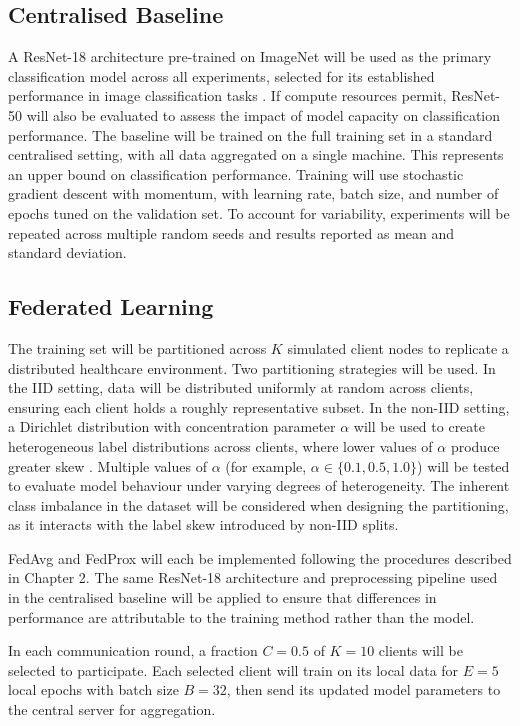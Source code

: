\documentclass[12pt,openany,a4paper]{book}
\begin{document}
\subsection{Centralised Baseline}
A ResNet-18 architecture pre-trained on ImageNet will be used as the primary classification model across all experiments, selected for its established performance in image classification tasks \cite{heDeepResidualLearning2015}. If compute resources permit, ResNet-50 will also be evaluated to assess the impact of model capacity on classification performance. The baseline will be trained on the full training set in a standard centralised setting, with all data aggregated on a single machine. This represents an upper bound on classification performance. Training will use stochastic gradient descent with momentum, with learning rate, batch size, and number of epochs tuned on the validation set. To account for variability, experiments will be repeated across multiple random seeds and results reported as mean and standard deviation.
\subsection{Federated Learning}
The training set will be partitioned across $K$ simulated client nodes to replicate a distributed healthcare environment. Two partitioning strategies will be used. In the IID setting, data will be distributed uniformly at random across clients, ensuring each client holds a roughly representative subset. In the non-IID setting, a Dirichlet distribution with concentration parameter $\alpha$ will be used to create heterogeneous label distributions across clients, where lower values of $\alpha$ produce greater skew \cite{hsuMeasuringEffectsNonIdentical2019}. Multiple values of $\alpha$ (for example, $\alpha\in\{0.1,0.5,1.0\}$) will be tested to evaluate model behaviour under varying degrees of heterogeneity. The inherent class imbalance in the dataset will be considered when designing the partitioning, as it interacts with the label skew introduced by non-IID splits.

FedAvg and FedProx will each be implemented following the procedures described in Chapter 2. The same ResNet-18 architecture and preprocessing pipeline used in the centralised baseline will be applied to ensure that differences in performance are attributable to the training method rather than the model. 

In each communication round, a fraction $C = 0.5$ of $K = 10$ clients will be selected to participate. Each selected client will train on its local data for $E = 5$ local epochs with batch size $B = 32$, then send its updated model parameters to the central server for aggregation. 
\end{document}
